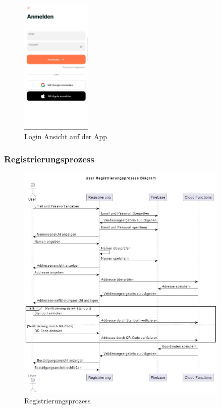 \begin{figure}[h]
  \centering
  \includegraphics[width=0.3\textwidth]{pics/login-page.jpg}
  \caption{Login Ansicht auf der App}
  \label{fig:login-page}
\end{figure}

\subsubsection{Registrierungsprozess}

\begin{figure}[h]
  \centering
  \includegraphics[width=0.9\textwidth]{pics/registration-sequence.JPG}
  \caption{Registrierungsprozess}
  \label{fig:registration-sequenze}
\end{figure}

